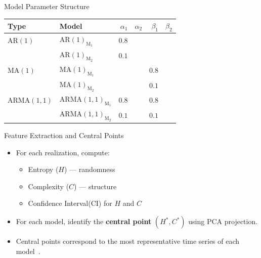 \documentclass[11pt]{beamer}
\begin{document}
\begin{frame}{Model Parameter Structure}
	\centering
	\scriptsize
	\begin{tabular}{llrrrr}
		\toprule
		Type & Model & $\alpha_1$ & $\alpha_2$ & $\beta_1$ & $\beta_2$ \\
		\midrule
		$\mathrm{AR}(1)$ & $\mathrm{AR}(1)_{\textrm{M}_1}$ & $0.8$ &  &  & \\
		& $\mathrm{AR}(1)_{\textrm{M}_2}$ & $0.1$ &  &  & \\
		$\mathrm{MA}(1)$ & $\mathrm{MA}(1)_{\textrm{M}_1}$ &  &  & $0.8$ & \\
		& $\mathrm{MA}(1)_{\textrm{M}_2}$ &  &  & $0.1$ & \\
		$\mathrm{ARMA}(1,1)$ & $\mathrm{ARMA}(1,1)_{\textrm{M}_1}$ & $0.8$ &  & $0.8$ & \\
		& $\mathrm{ARMA}(1,1)_{\textrm{M}_2}$ & $0.1$ &  & $0.1$ & \\
		\bottomrule
	\end{tabular}
\end{frame}

\begin{frame}{Feature Extraction and Central Points}
	\begin{itemize}
			\item For each realization, compute:
			\begin{itemize}
				\item Entropy (\(H\)) — randomness
				\item Complexity (\(C\)) — structure
				\item Confidence Interval(CI) for $H$ and $C$
			\end{itemize}
			\item For each model, identify the \textbf{central point} $(H^*, C^*)$ using PCA projection.
			\item Central points correspond to the most representative time series of each model~\cite{Chagas2022a}. 
		\end{itemize}
\end{frame}

\end{document}

